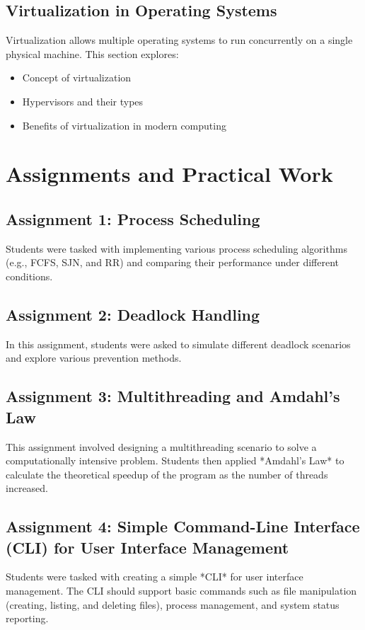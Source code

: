 \documentclass{article}
\begin{document}
\subsection{Virtualization in Operating Systems}
Virtualization allows multiple operating systems to run concurrently on a single physical machine. This section explores:
\begin{itemize}
    \item Concept of virtualization
    \item Hypervisors and their types
    \item Benefits of virtualization in modern computing
\end{itemize}

\section{Assignments and Practical Work}
\subsection{Assignment 1: Process Scheduling}
Students were tasked with implementing various process scheduling algorithms (e.g., FCFS, SJN, and RR) and comparing their performance under different conditions.

\subsection{Assignment 2: Deadlock Handling}
In this assignment, students were asked to simulate different deadlock scenarios and explore various prevention methods.

\subsection{Assignment 3: Multithreading and Amdahl's Law}
This assignment involved designing a multithreading scenario to solve a computationally intensive problem. Students then applied *Amdahl's Law* to calculate the theoretical speedup of the program as the number of threads increased.

\subsection{Assignment 4: Simple Command-Line Interface (CLI) for User Interface Management}
Students were tasked with creating a simple *CLI* for user interface management. The CLI should support basic commands such as file manipulation (creating, listing, and deleting files), process management, and system status reporting.
\end{document}
